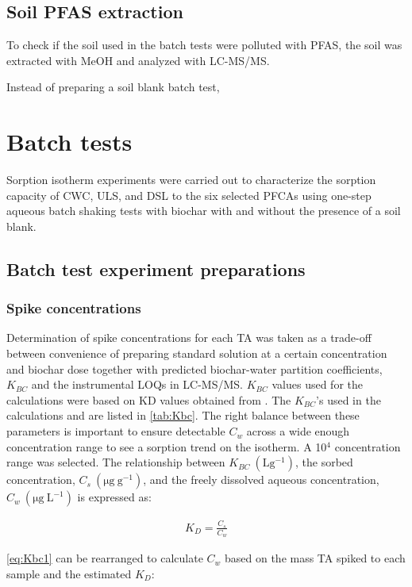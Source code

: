 \subsection{Soil PFAS extraction}
To check if the soil used in the batch tests were polluted with PFAS, the soil was extracted with MeOH and analyzed with LC-MS/MS. 

Instead of preparing a soil blank batch test,

\section{Batch tests}
Sorption isotherm experiments were carried out to characterize the sorption capacity of CWC, ULS, and DSL to the six selected PFCAs using one-step aqueous batch shaking tests with biochar with and without the presence of a soil blank. 

\subsection{Batch test experiment preparations}

\subsubsection{Spike concentrations}
Determination of spike concentrations for each TA was taken as a trade-off between convenience of preparing standard solution at a certain concentration and biochar dose together with predicted biochar-water partition coefficients, $K_{BC}$ and the instrumental LOQs in LC-MS/MS. $K_{BC}$ values used for the calculations were based on KD values obtained from \cite{Xiao2017}. The $K_{BC}$'s used in the calculations and are listed in \cref{tab:Kbc}. The right balance between these parameters is important to ensure detectable $C_w$ across a wide enough concentration range to see a sorption trend on the isotherm. A 10$^4$ concentration range was selected. The relationship between $K_{BC}~\mathrm{(L g^{-1})}$, the sorbed concentration, $C_s~\mathrm{(\mu g~g^{-1})}$, and the freely dissolved aqueous concentration, $C_w~\mathrm{(\mu g~L^{-1})}$ is expressed as:

\begin{align}
    \label{eq:Kbc1}
    K_{D} = \frac{C_s}{C_w}
\end{align}

\cref{eq:Kbc1} can be rearranged to calculate $C_w$ based on the mass TA spiked to each sample and the estimated $K_D$:

